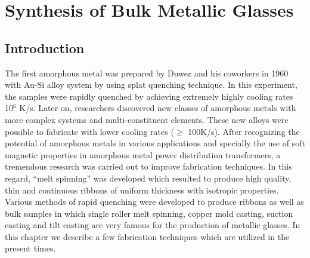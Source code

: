 \chapter{Synthesis of Bulk Metallic Glasses}

\section{Introduction}
The first amorphous metal was prepared by Duwez and his coworkers in 1960 with Au-Si alloy system by using splat quenching technique. In this experiment, the samples were rapidly quenched by achieving extremely highly cooling rates ~ 10$^6$ K/s. Later on, researchers discovered new classes of amorphous metals with more complex systems and multi-constituent elements. These new alloys were possible to fabricate with lower cooling rates ($\geq$ 100K/s). After recognizing the potential of amorphous metals in various applications and specially the use of soft magnetic properties in amorphous metal power distribution transformers, a tremendous research was carried out to improve fabrication techniques. In this regard, “melt spinning” was developed which resulted to produce high quality, thin and continuous ribbons of uniform thickness with isotropic properties. Various methods of rapid quenching were developed to produce ribbons as well as bulk samples in which single roller melt spinning, copper mold casting, suction casting and tilt casting are very famous for the production of metallic glasses. In this chapter we describe a few fabrication techniques which are utilized in the present times.


